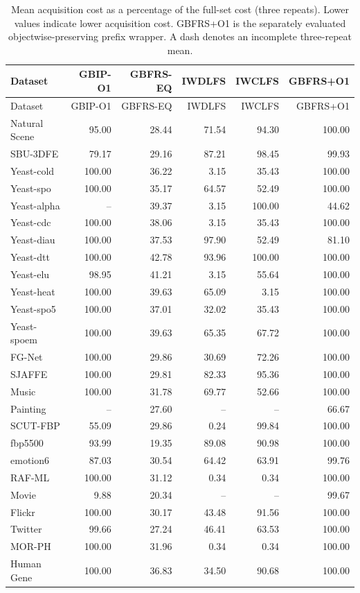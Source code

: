 \begin{longtable}{lrrrrr}
\caption{Mean acquisition cost as a percentage of the full-set cost (three repeats). Lower values indicate lower acquisition cost. GBFRS+O1 is the separately evaluated objectwise-preserving prefix wrapper. A dash denotes an incomplete three-repeat mean.}\label{tab:expanded-cost}\\
\toprule
Dataset & GBIP-O1 & GBFRS-EQ & IWDLFS & IWCLFS & GBFRS+O1 \\
\midrule\endfirsthead
\toprule
Dataset & GBIP-O1 & GBFRS-EQ & IWDLFS & IWCLFS & GBFRS+O1 \\
\midrule\endhead
Natural Scene & 95.00 & 28.44 & 71.54 & 94.30 & 100.00 \\
SBU-3DFE & 79.17 & 29.16 & 87.21 & 98.45 & 99.93 \\
Yeast-cold & 100.00 & 36.22 & 3.15 & 35.43 & 100.00 \\
Yeast-spo & 100.00 & 35.17 & 64.57 & 52.49 & 100.00 \\
Yeast-alpha & -- & 39.37 & 3.15 & 100.00 & 44.62 \\
Yeast-cdc & 100.00 & 38.06 & 3.15 & 35.43 & 100.00 \\
Yeast-diau & 100.00 & 37.53 & 97.90 & 52.49 & 81.10 \\
Yeast-dtt & 100.00 & 42.78 & 93.96 & 100.00 & 100.00 \\
Yeast-elu & 98.95 & 41.21 & 3.15 & 55.64 & 100.00 \\
Yeast-heat & 100.00 & 39.63 & 65.09 & 3.15 & 100.00 \\
Yeast-spo5 & 100.00 & 37.01 & 32.02 & 35.43 & 100.00 \\
Yeast-spoem & 100.00 & 39.63 & 65.35 & 67.72 & 100.00 \\
FG-Net & 100.00 & 29.86 & 30.69 & 72.26 & 100.00 \\
SJAFFE & 100.00 & 29.81 & 82.33 & 95.36 & 100.00 \\
Music & 100.00 & 31.78 & 69.77 & 52.66 & 100.00 \\
Painting & -- & 27.60 & -- & -- & 66.67 \\
SCUT-FBP & 55.09 & 29.86 & 0.24 & 99.84 & 100.00 \\
fbp5500 & 93.99 & 19.35 & 89.08 & 90.98 & 100.00 \\
emotion6 & 87.03 & 30.54 & 64.42 & 63.91 & 99.76 \\
RAF-ML & 100.00 & 31.12 & 0.34 & 0.34 & 100.00 \\
Movie & 9.88 & 20.34 & -- & -- & 99.67 \\
Flickr & 100.00 & 30.17 & 43.48 & 91.56 & 100.00 \\
Twitter & 99.66 & 27.24 & 46.41 & 63.53 & 100.00 \\
MOR-PH & 100.00 & 31.96 & 0.34 & 0.34 & 100.00 \\
Human Gene & 100.00 & 36.83 & 34.50 & 90.68 & 100.00 \\
\bottomrule
\end{longtable}

